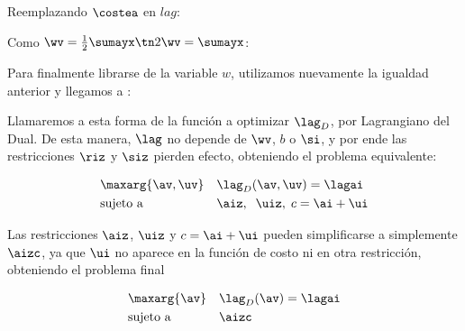 Reemplazando $\costea$ en $lag$:

\ma{
  \lag 
&= \costew + \sumi \ai \si - \costea \\
&= \costew + \sumi \ai \si - (\sumi(\wv \cdot \xi) \yi \ai + \sumi \si \ai - \sumi \ai)\\
&= \costew + \sumi \ai \si - \sumi(\wv \cdot \xi) \yi \ai - \sumi \si \ai + \sumi \ai \\
&= \costew  - \sumi(\wv \cdot \xi) \yi \ai + \sumi \ai \\
&= \costew  - \wv \cdot \sumayx + \sumi \ai
}

Como $\wv = \frac{1}{2} \sumayx \tn 2\wv= \sumayx$:

\ma{
  \lag 
&= \costew  - \wv \cdot \sumayx + \sumi \ai \\
&= \costew  - \wv \cdot 2\wv + \sumi \ai \\
&= \costew  - 2 \costew + \sumi \ai \\
&=  - \costew   + \sumi \ai
}

Para finalmente librarse de la variable $w$, utilizamos nuevamente la igualdad anterior y llegamos a :


Llamaremos a esta forma de la función a optimizar $\lag_D$, por Lagrangiano del Dual. De esta manera, $\lag$ no depende de $\wv$, $b$ o $\si$, y por ende las restricciones $\riz$ y $\siz$ pierden efecto, obteniendo el problema equivalente:


\begin{equation*}
\begin{aligned}
&  \maxarg{\av,\uv}
& & \lag_D(\av,\uv)= \lagai \\
& \text{sujeto a}
& & \aiz, \;\;  \uiz, \;  c = \ai+\ui 
\end{aligned}
\end{equation*}

Las restricciones $\aiz$, $\uiz$ y $ c = \ai+\ui $ pueden simplificarse a simplemente $ \aizc$, ya que $\ui$ no aparece en la función de costo ni en otra restricción, obteniendo el problema final 

\begin{equation}
\begin{aligned}
&  \maxarg{\av}
& & \lag_D(\av)= \lagai \\
& \text{sujeto a}
& & \aizc
\end{aligned}
\end{equation}


